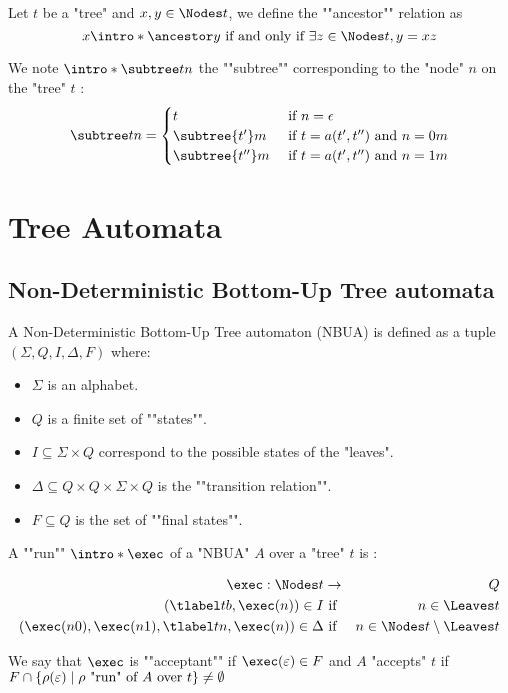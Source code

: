 \documentclass{article}
\begin{document}
\begin{definition}
	Let $t$ be a "tree" and $x, y \in \Nodes t$, we define the ""ancestor"" relation as
	\[  x \intro* \ancestor y \tiff \exists z \in \Nodes t, y = xz \]
\end{definition}


\begin{definition}
	We note $\intro* \subtree t n$ the ""subtree"" corresponding to the "node" $n$ on the "tree" $t$ :
	\[
		\subtree t n =   \begin{cases}
			t                & \text{ if }  n = \epsilon                     \\
			\subtree {t'} m  & \text{ if } t = a(t',t'') \text{ and } n = 0m \\
			\subtree {t''} m & \text{ if } t = a(t',t'') \text{ and } n = 1m
		\end{cases}
	\]
\end{definition}


\section{Tree Automata}
\subsection{Non-Deterministic Bottom-Up Tree automata}

\begin{definition}
	A Non-Deterministic Bottom-Up Tree automaton (NBUA) is defined as a tuple
	$(\Sigma, Q, I, \Delta, F)$ where:
	\begin{itemize}
		\item $\Sigma$ is an alphabet.
		\item $Q$ is a finite set of ""states"".
		\item $I \subseteq \Sigma \times Q$ correspond to the possible states of the "leaves".
		\item $\Delta \subseteq Q \times Q \times \Sigma \times Q$ is the ""transition relation"".
		\item $F \subseteq Q$ is the set of ""final states"".
	\end{itemize}
\end{definition}

\begin{definition}
	A ""run"" $\intro* \exec$ of a "NBUA" $A$ over a "tree" $t$ is :

	\begin{eqnarray*}
		\exec : \Nodes t &\to& Q \\
		(\tlabel t b,  \exec (n) ) \in I &\text{ if }& n \in \Leaves t \\
		(\exec (n0), \exec (n1), \tlabel t n, \exec (n)) \in \Delta &\text{ if }& n \in \Nodes t \setminus \Leaves t
	\end{eqnarray*}

	We say that $\exec$ is ""acceptant"" if $\exec (\varepsilon) \in F$ and $A$ "accepts" $t$ if
	$F \cap \left\{\rho(\varepsilon) \mid \text{$\rho$ "run" of~$A$ over~$t$}\right\} \neq \emptyset$
\end{definition}
\end{document}
